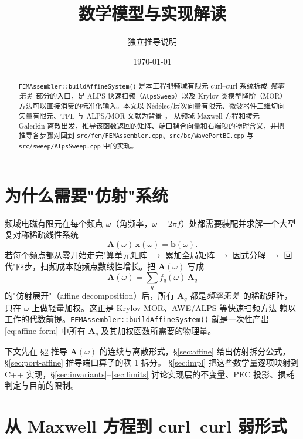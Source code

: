 \documentclass[UTF8,a4paper,11pt]{ctexart}
\title{\texorpdfstring{\code{FEMAssembler::buildAffineSystem()} 数学模型与实现解读}{FEMAssembler::buildAffineSystem() 数学模型与实现解读}}
\author{独立推导说明}
\date{\today}
\newcommand{\code}[1]{\texttt{\small #1}}
\begin{document}
\maketitle

\begin{abstract}
\code{FEMAssembler::buildAffineSystem()} 是本工程把频域有限元 curl--curl 系统拆成
\emph{频率无关}\ 部分的入口，是 ALPS 快速扫频（\code{AlpsSweep}）以及 Krylov 类模型降阶（MOR）方法可以直接消费的标准化输入。本文以 Nédélec/层次向量有限元、微波器件三维切向矢量有限元、TFE 与 ALPS/MOR 文献为背景
\cite{Nedelec1980,Graglia1997,Webb1999,Cendes1988,Lee1990,Bracken1998,Sun2001,Anderson2004}，
从频域 Maxwell 方程和棱元 Galerkin 离散出发，推导该函数返回的矩阵、端口耦合向量和右端项的物理含义，并把推导各步骤对回到 \code{src/fem/FEMAssembler.cpp}、\code{src/bc/WavePortBC.cpp} 与 \code{src/sweep/AlpsSweep.cpp} 中的实现。
\end{abstract}

\tableofcontents

\section{为什么需要"仿射"系统}
\label{sec:why-affine}

频域电磁有限元在每个频点 $\omega$（角频率，$\omega=2\pi f$）处都需要装配并求解一个大型复对称稀疏线性系统
\begin{equation}
    \bm A(\omega)\,\bm x(\omega)=\bm b(\omega).
    \label{eq:per-freq}
\end{equation}
若每个频点都从零开始走完"算单元矩阵 $\to$ 累加全局矩阵 $\to$ 因式分解 $\to$ 回代"四步，扫频成本随频点数线性增长。把 $\bm A(\omega)$ 写成
\begin{equation}
    \bm A(\omega)=\sum_{q} f_q(\omega)\,\bm A_q
    \label{eq:affine-form}
\end{equation}
的"仿射展开"（affine decomposition）后，所有 $\bm A_q$ 都是\emph{频率无关}\ 的稀疏矩阵，
只在 $\omega$ 上做轻量加权。这正是 Krylov MOR、AWE/ALPS 等快速扫频方法
赖以工作的代数前提。\code{FEMAssembler::buildAffineSystem()} 就是一次性产出
\eqref{eq:affine-form} 中所有 $\bm A_q$ 及其加权函数所需要的物理量。

下文先在 §\ref{sec:weak-form} 推导 $\bm A(\omega)$ 的连续与离散形式，§\ref{sec:affine}
给出仿射拆分公式，§\ref{sec:port-affine} 推导端口算子的秩 1 拆分。
§\ref{sec:impl} 把这些数学量逐项映射到 C++ 实现，§\ref{sec:invariants}--\ref{sec:limits}
讨论实现层的不变量、PEC 投影、损耗判定与目前的限制。

\section{从 Maxwell 方程到 curl--curl 弱形式}
\label{sec:weak-form}
\end{document}

